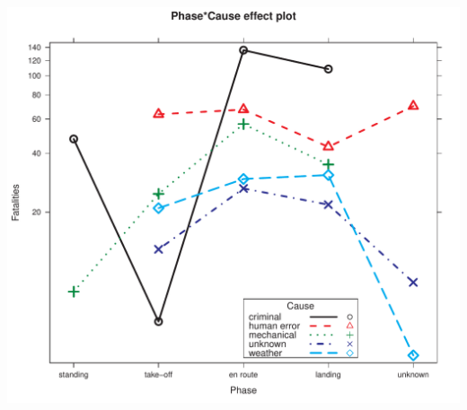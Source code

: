 \documentclass[10pt]{report}\usepackage[]{graphicx}\usepackage[]{color}
\newenvironment{knitrout}{}{} %
\renewenvironment{knitrout}{\small\renewcommand{\baselinestretch}{.85}}{} %
\begin{document}
\begin{Exercises}
\begin{enumerate*}
\begin{ans}
\begin{knitrout}
\centerline{\includegraphics[width=.5\textwidth]{soln/fig/ex11_3d2-1} }



\end{knitrout}

    \end{ans}
    
  \end{enumerate*}
  

\end{Exercises}
\end{document}
